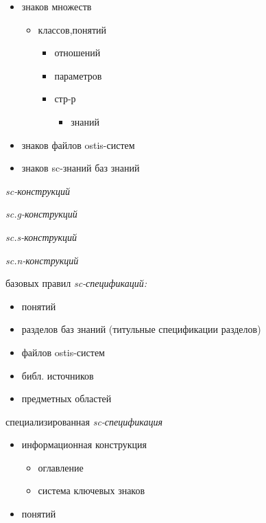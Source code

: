 \begin{SCn}
{\begin{scnitemize}
\begin{itemize}
\begin{itemize}
			\item знаков персон
			\item знаков библ.-источников 
		\end{itemize}
		\item знаков множеств 
		\begin{itemize}
			\item классов,понятий
			\begin{itemize}
				\item отношений
				\item параметров
				\item стр-р
				\begin{itemize}
					\item знаний
				\end{itemize}
			\end{itemize}
		\end{itemize}
		\item знаков файлов ostis-систем
		\item знаков sc-знаний баз знаний 
	\end{itemize}
	\item\textit{sc-конструкций}
	\item\textit{sc.g-конструкций}
	\item\textit{sc.s-конструкций}
	\item\textit{sc.n-конструкций}
	\item базовых правил \textit{sc-спецификаций:}
	\begin{itemize}
		\item понятий 
		\item разделов баз знаний (титульные спецификации разделов)
		\item файлов ostis-систем
		\item библ. источников
		\item предметных областей 	
	\end{itemize}
	\item специализированная \textit{sc-спецификация}
	\begin{itemize}
		\item информационная конструкция
		\begin{itemize}
			\item оглавление
			\item система ключевых знаков	
		\end{itemize}
	\end{itemize}
	\begin{itemize}
		\item понятий

\end{itemize}
\end{scnitemize}}
\end{SCn}
